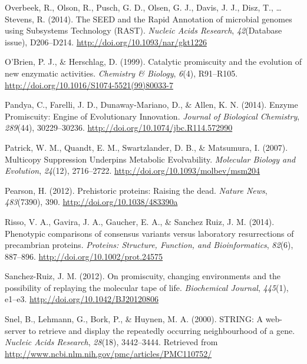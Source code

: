 \documentclass[12pt,twoside]{reedthesis}
\begin{document}
  \hypertarget{ref-overbeekux5fseedux5f2014}{}
  Overbeek, R., Olson, R., Pusch, G. D., Olsen, G. J., Davis, J. J., Disz,
  T., \ldots{} Stevens, R. (2014). The SEED and the Rapid Annotation of
  microbial genomes using Subsystems Technology (RAST). \emph{Nucleic
  Acids Research}, \emph{42}(Database issue), D206--D214.
  \url{http://doi.org/10.1093/nar/gkt1226}
  
  \hypertarget{ref-obrienux5fcatalyticux5f1999}{}
  O'Brien, P. J., \& Herschlag, D. (1999). Catalytic promiscuity and the
  evolution of new enzymatic activities. \emph{Chemistry \& Biology},
  \emph{6}(4), R91--R105.
  \url{http://doi.org/10.1016/S1074-5521(99)80033-7}
  
  \hypertarget{ref-pandyaux5fenzymeux5f2014}{}
  Pandya, C., Farelli, J. D., Dunaway-Mariano, D., \& Allen, K. N. (2014).
  Enzyme Promiscuity: Engine of Evolutionary Innovation. \emph{Journal of
  Biological Chemistry}, \emph{289}(44), 30229--30236.
  \url{http://doi.org/10.1074/jbc.R114.572990}
  
  \hypertarget{ref-patrickux5fmulticopyux5f2007}{}
  Patrick, W. M., Quandt, E. M., Swartzlander, D. B., \& Matsumura, I.
  (2007). Multicopy Suppression Underpins Metabolic Evolvability.
  \emph{Molecular Biology and Evolution}, \emph{24}(12), 2716--2722.
  \url{http://doi.org/10.1093/molbev/msm204}
  
  \hypertarget{ref-pearsonux5fprehistoricux5f2012}{}
  Pearson, H. (2012). Prehistoric proteins: Raising the dead. \emph{Nature
  News}, \emph{483}(7390), 390. \url{http://doi.org/10.1038/483390a}
  
  \hypertarget{ref-rissoux5fphenotypicux5f2014}{}
  Risso, V. A., Gavira, J. A., Gaucher, E. A., \& Sanchez Ruiz, J. M.
  (2014). Phenotypic comparisons of consensus variants versus laboratory
  resurrections of precambrian proteins. \emph{Proteins: Structure,
  Function, and Bioinformatics}, \emph{82}(6), 887--896.
  \url{http://doi.org/10.1002/prot.24575}
  
  \hypertarget{ref-sanchez-ruizux5fpromiscuityux5f2012}{}
  Sanchez-Ruiz, J. M. (2012). On promiscuity, changing environments and
  the possibility of replaying the molecular tape of life.
  \emph{Biochemical Journal}, \emph{445}(1), e1--e3.
  \url{http://doi.org/10.1042/BJ20120806}
  
  \hypertarget{ref-snelux5fstring:ux5f2000}{}
  Snel, B., Lehmann, G., Bork, P., \& Huynen, M. A. (2000). STRING: A
  web-server to retrieve and display the repeatedly occurring
  neighbourhood of a gene. \emph{Nucleic Acids Research}, \emph{28}(18),
  3442--3444. Retrieved from
  \url{http://www.ncbi.nlm.nih.gov/pmc/articles/PMC110752/}
  
\end{document}
